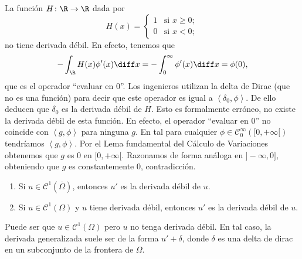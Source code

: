 \documentclass{article}
\begin{document}
\begin{ex}
  La función $H \colon \R \to \R$ dada por
  \[ H(x) =
    \begin{cases}
      1 & \text{si } x \ge 0; \\
      0 & \text{si } x < 0;
    \end{cases}
  \]
  no tiene derivada débil. En efecto, tenemos que
  \[ - \int_{\R} H(x)\phi'(x) \diff x = - \int_0^{\infty} \phi'(x) \diff x = \phi(0),\] que es el
  operador ``evaluar en $0$''. Los ingenieros utilizan la delta de Dirac (que no es una función)
  para decir que este operador es igual a $\left\langle \delta_0, \phi \right\rangle$. De ello
  deducen que $\delta_0$ es la derivada débil de $H$. Esto es formalmente erróneo, no existe la
  derivada débil de esta función. En efecto, el operador ``evaluar en $0$'' no coincide con
  $\left\langle g, \phi \right\rangle$ para ninguna $g$. En tal para cualquier
  $\phi \in \mathcal{C}_0^{\infty}([0, +\infty[)$ tendríamos $\left\langle g, \phi
  \right\rangle$. Por el Lema fundamental del Cálculo de Variaciones obtenemos que $g$ es $0$ en
  $[0,+\infty[$. Razonamos de forma análoga en $]-\infty, 0]$, obteniendo que $g$ es constantemente
  $0$, contradicción.
\end{ex}

\begin{proposition}
  \begin{enumerate}
  \item Si $u \in \mathcal{C}^1(\overline{\Omega})$, entonces $u'$ es la derivada débil de $u$.
  \item Si $u \in \mathcal{C}^1(\Omega)$ y $u$ tiene derivada débil, entonces $u'$ es la derivada
    débil de $u$.
  \end{enumerate}
\end{proposition}

Puede ser que $u \in \mathcal{C}^1(\Omega)$ pero $u$ no tenga derivada débil. En tal caso, la
derivada generalizada suele ser de la forma $u' + \delta$, donde $\delta$ es una delta de dirac en
un subconjunto de la frontera de $\Omega$.
\end{document}
